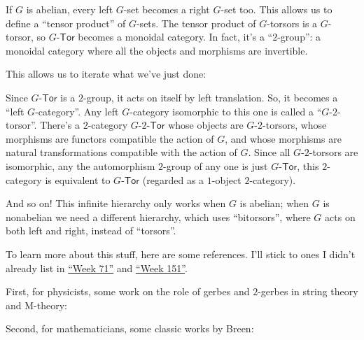 \documentclass{article}
\renewcommand{\texttt}[1]{%
  \begingroup
  \ttfamily
  \begingroup\lccode`~=`/\lowercase{\endgroup\def~}{/\discretionary{}{}{}}%
  \begingroup\lccode`~=`[\lowercase{\endgroup\def~}{[\discretionary{}{}{}}%
  \begingroup\lccode`~=`.\lowercase{\endgroup\def~}{.\discretionary{}{}{}}%
  \catcode`/=\active\catcode`[=\active\catcode`.=\active
  \scantokens{#1\noexpand}%
  \endgroup
}
\begin{document}
If \(G\) is abelian, every left \(G\)-set becomes a right \(G\)-set too.
This allows us to define a ``tensor product'' of \(G\)-sets. The tensor
product of \(G\)-torsors is a \(G\)-torsor, so \(G\)-\(\mathsf{Tor}\)
becomes a monoidal category. In fact, it's a ``\(2\)-group'': a monoidal
category where all the objects and morphisms are invertible.

This allows us to iterate what we've just done:

Since \(G\)-\(\mathsf{Tor}\) is a \(2\)-group, it acts on itself by left
translation. So, it becomes a ``left \(G\)-category''. Any left
\(G\)-category isomorphic to this one is called a
``\(G\)-\(2\)-torsor''. There's a \(2\)-category
\(G\)-\(2\)-\(\mathsf{Tor}\) whose objects are \(G\)-\(2\)-torsors,
whose morphisms are functors compatible the action of \(G\), and whose
morphisms are natural transformations compatible with the action of
\(G\). Since all \(G\)-\(2\)-torsors are isomorphic, any the
automorphism \(2\)-group of any one is just \(G\)-\(\mathsf{Tor}\), this
\(2\)-category is equivalent to \(G\)-\(\mathsf{Tor}\) (regarded as a
\(1\)-object \(2\)-category).

And so on! This infinite hierarchy only works when \(G\) is abelian;
when \(G\) is nonabelian we need a different hierarchy, which uses
``bitorsors'', where \(G\) acts on both left and right, instead of
``torsors''.

To learn more about this stuff, here are some references. I'll stick to
ones I didn't already list in \protect\hyperlink{week71}{``Week 71''}
and \protect\hyperlink{week151}{``Week 151''}.

First, for physicists, some work on the role of gerbes and \(2\)-gerbes
in string theory and M-theory:


Second, for mathematicians, some classic works by Breen:
\end{document}

